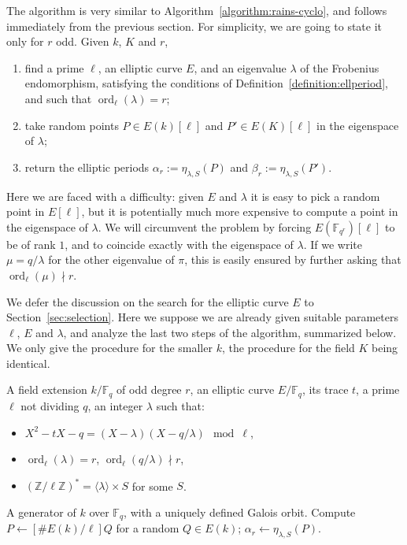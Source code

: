 \documentclass[12pt]{article}
\theoremstyle{plain}
\theoremstyle{definition}
\DeclareMathOperator{\order}{ord} %
\def\Z{\ensuremath{\mathbb{Z}}}
\def\F{\ensuremath{\mathbb{F}}}
\newcounter{algorithm}
\begin{document}
The algorithm is very similar to
Algorithm~\ref{algorithm:rains-cyclo}, and follows immediately from
the previous section. For simplicity, we are going to state it only
for $r$ odd. Given $k$, $K$ and $r$,
\begin{enumerate}
\item find a prime $\ell$, an elliptic curve $E$, and an eigenvalue
  $\lambda$ of the Frobenius endomorphism, satisfying the conditions
  of Definition~\ref{definition:ellperiod}, and such that
  $\order_\ell(\lambda)=r$;
\item take random points $P\in E(k)[\ell]$ and $P'\in E(K)[\ell]$ in
  the eigenspace of $\lambda$;
\item return the elliptic periods $\alpha_r := \eta_{\lambda,S}(P)$ and
  $\beta_r:= \eta_{\lambda,S}(P')$.
\end{enumerate}

Here we are faced with a difficulty: given $E$ and $\lambda$ it is
easy to pick a random point in $E[\ell]$, but it is potentially much
more expensive to compute a point in the eigenspace of $\lambda$. We
will circumvent the problem by forcing $E(\F_{q^r})[\ell]$ to be of
rank $1$, and to coincide exactly with the eigenspace of $\lambda$.
If we write $\mu = q/\lambda$ for the other eigenvalue of $\pi$, this
is easily ensured by further asking that $\order_\ell(\mu) \nmid r$.

We defer the discussion on the search for the elliptic curve $E$ to
Section~\ref{sec:selection}. Here we suppose we are already given
suitable parameters $\ell$, $E$ and $\lambda$, and analyze the last
two steps of the algorithm, summarized below.  We only give the
procedure for the smaller $k$, the procedure for the field $K$ being
identical.

\begin{algorithm}
\label{algorithm:compell}
  \begin{algorithmic}[1]
    \REQUIRE A field extension $k/\F_q$ of odd degree $r$,
    an elliptic curve $E/\F_q$, its trace $t$, a prime $\ell$ not dividing $q$,
    an integer $\lambda$ such that:
    \begin{itemize}
    \item $X^2 - tX - q = (X-\lambda)(X-q/\lambda) \mod\ell$,
    \item $\order_\ell(\lambda)=r$, $\order_\ell(q/\lambda)\nmid r$,
    \item $(\Z/\ell\Z)^{\ast} = \langle{\lambda}\rangle \times S$ for some $S$.
    \end{itemize}
    \ENSURE A generator of $k$ over $\F_q$, with a uniquely defined Galois orbit.
    \REPEAT
    \STATE Compute $P\leftarrow[\# E(k)/\ell]Q$ for a random $Q\in E(k)$;
    \RETURN $\alpha_r\leftarrow\eta_{\lambda,S}(P)$.
  \end{algorithmic}
\end{algorithm}
\end{document}
